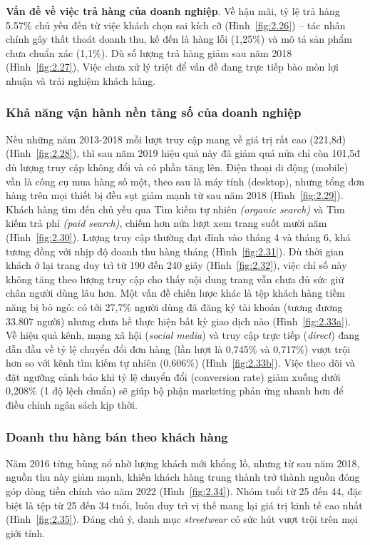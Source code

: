 \documentclass{article}
\begin{document}
\textbf{Vấn đề về việc trả hàng của doanh nghiệp}. Về hậu mãi, tỷ lệ trả hàng 5.57\% chủ yếu đến từ việc khách chọn sai kích cỡ (Hình~\ref{fig:2.26}) – tác nhân chính gây thất thoát doanh thu, kế đến là hàng lỗi (1,25\%) và mô tả sản phẩm chưa chuẩn xác (1,1\%). Dù số lượng trả hàng giảm sau năm 2018 (Hình~\ref{fig:2.27}), Việc chưa xử lý triệt để vấn đề đang trực tiếp bào mòn lợi nhuận và trải nghiệm khách hàng. 

\subsubsection{Khả năng vận hành nền tảng số của doanh nghiệp}
Nếu những năm 2013-2018 mỗi lượt truy cập mang về giá trị rất cao (221,8đ) (Hình~\ref{fig:2.28}), thì sau năm 2019 hiệu quả này đã giảm quá nửa chỉ còn 101,5đ dù lượng truy cập không đổi và có phần tăng lên.
Điện thoại di động (mobile) vẫn là công cụ mua hàng số một, theo sau là máy tính (desktop), nhưng tổng đơn hàng trên mọi thiết bị đều sụt giảm mạnh từ sau năm 2018 (Hình~\ref{fig:2.29}). Khách hàng tìm đến chủ yếu qua Tìm kiếm tự nhiên \textit{(organic search)} và Tìm kiếm trả phí \textit{(paid search)}, chiếm hơn nửa lượt xem trang suốt mười năm (Hình~\ref{fig:2.30}). Lượng truy cập thường đạt đỉnh vào tháng 4 và tháng 6, khá tương đồng với nhịp độ doanh thu hàng tháng (Hình~\ref{fig:2.31}). Dù thời gian khách ở lại trang duy trì từ 190 đến 240 giây (Hình~\ref{fig:2.32}), việc chỉ số này không tăng theo lượng truy cập cho thấy nội dung trang vẫn chưa đủ sức giữ chân người dùng lâu hơn.
Một vấn đề chiến lược khác là tệp khách hàng tiềm năng bị bỏ ngỏ: có tới 27,7\% người dùng đã đăng ký tài khoản (tương đương 33.807 người) nhưng chưa hề thực hiện bất kỳ giao dịch nào (Hình~\ref{fig:2.33a}). Về hiệu quả kênh, mạng xã hội (\textit{social media}) và truy cập trực tiếp (\textit{direct}) đang dẫn đầu về tỷ lệ chuyển đổi đơn hàng (lần lượt là 0,745\% và 0,717\%) vượt trội hơn so với kênh tìm kiếm tự nhiên (0,606\%)  (Hình~\ref{fig:2.33b}). Việc theo dõi và đặt ngưỡng cảnh báo khi tỷ lệ chuyển đổi (conversion rate) giảm xuống dưới 0,208\% (1 độ lệch chuẩn) sẽ giúp bộ phận marketing phản ứng nhanh hơn để điều chỉnh ngân sách kịp thời.

\subsubsection{Doanh thu hàng bán theo khách hàng}
Năm 2016 từng bùng nổ nhờ lượng khách mới khổng lồ, nhưng từ sau năm 2018, nguồn thu này giảm mạnh, khiến khách hàng trung thành trở thành nguồn đóng góp dòng tiền chính vào năm 2022 (Hình~\ref{fig:2.34}).
Nhóm tuổi từ 25 đến 44, đặc biệt là tệp từ 25 đến 34 tuổi, luôn duy trì vị thế mang lại giá trị kinh tế cao nhất (Hình~\ref{fig:2.35}). Đáng chú ý, danh mục \textit{streetwear} có sức hút vượt trội trên mọi giới tính.
\end{document}
